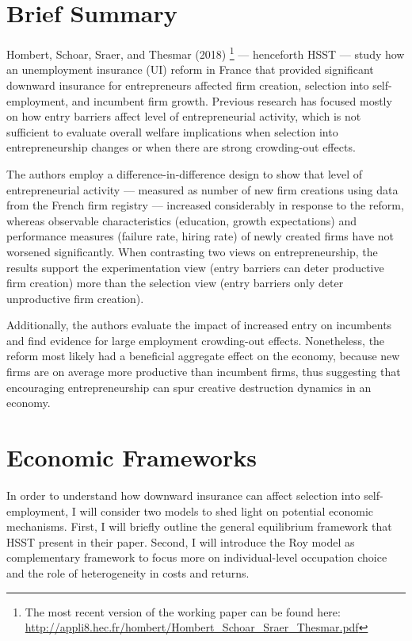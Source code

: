 \section{Brief Summary}

Hombert, Schoar, Sraer, and Thesmar (2018)
\footnote{The most recent version of the working paper can be found here: \url{http://appli8.hec.fr/hombert/Hombert_Schoar_Sraer_Thesmar.pdf}}
--- henceforth HSST --- study how an unemployment insurance (UI) reform in France that provided significant downward insurance for entrepreneurs affected firm creation, selection into self-employment, and incumbent firm growth. Previous research has focused mostly on how entry barriers affect level of entrepreneurial activity, which is not sufficient to evaluate overall welfare implications when selection into entrepreneurship changes or when there are strong crowding-out effects. \newline

\noindent The authors employ a difference-in-difference design to show that level of entrepreneurial activity --- measured as number of new firm creations using data from the French firm registry --- increased considerably in response to the reform, whereas observable characteristics (education, growth expectations) and performance measures (failure rate, hiring rate) of newly created firms have not worsened significantly. When contrasting two views on entrepreneurship, the results support the experimentation view (entry barriers can deter productive firm creation) more than the selection view (entry barriers only deter unproductive firm creation).

Additionally, the authors evaluate the impact of increased entry on incumbents and find evidence for large employment crowding-out effects. Nonetheless, the reform most likely had a beneficial aggregate effect on the economy, because new firms are on average more productive than incumbent firms, thus suggesting that encouraging entrepreneurship can spur creative destruction dynamics in an economy.



\section{Economic Frameworks}

In order to understand how downward insurance can affect selection into self-employment, I will consider two models to shed light on potential economic mechanisms. First, I will briefly outline the general equilibrium framework that HSST present in their paper. Second, I will introduce the Roy model as complementary framework to focus more on individual-level occupation choice and the role of heterogeneity in costs and returns.

